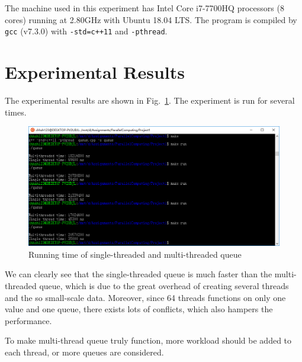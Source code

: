 \documentclass[english]{thesis}
\begin{document}
The machine used in this experiment has Intel Core i7-7700HQ processors (8 cores) running at 2.80GHz with Ubuntu 18.04 LTS.
The program is compiled by \verb'gcc' (v7.3.0) with \verb'-std=c++11' and \verb'-pthread'.

\section{Experimental Results}
The experimental results are shown in Fig.~\ref{fig:result}.
The experiment is run for several times.
\begin{figure}[H]
\centering
\includegraphics[width=0.8\linewidth]{results.PNG}
\caption{Running time of single-threaded and multi-threaded queue}
\label{fig:result}
\end{figure}

We can clearly see that the single-threaded queue is much faster than the multi-threaded queue, which is due to the great overhead of creating several threads and the so small-scale data.
Moreover, since 64 threads functions on only one value and one queue, there exists lots of conflicts, which also hampers the performance.

To make multi-thread queue truly function, more workload should be added to each thread, or more queues are considered.

\appendix
\appendixconfig
\end{document}
